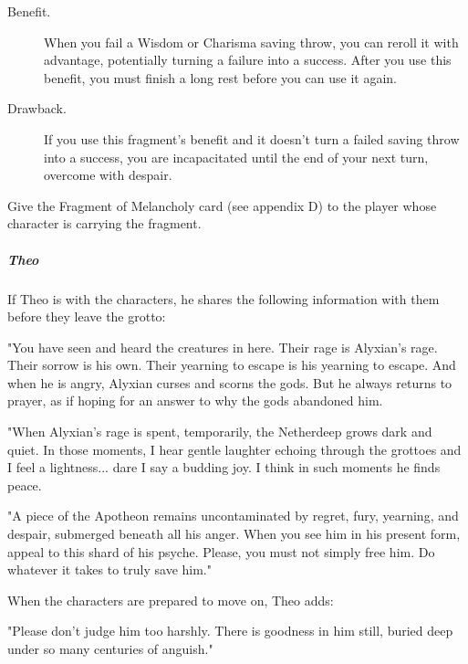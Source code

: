 \documentclass[10pt,a4paper,twoside,bg=print,twocolumn,openany,nodeprecatedcode]{dndbook}
\begin{document}
\begin{DndSidebar}[float=!b]{}

\begin{description}
\item[Benefit.]
When you fail a Wisdom or Charisma saving throw, you can reroll it with advantage, potentially turning a failure into a success. After you use this benefit, you must finish a long rest before you can use it again.
\item[Drawback.]
If you use this fragment's benefit and it doesn't turn a failed saving throw into a success, you are incapacitated until the end of your next turn, overcome with despair.
\end{description}



\end{DndSidebar}

Give the Fragment of Melancholy card (see appendix D) to the player whose character is carrying the fragment.

\subparagraph{Theo}
If Theo is with the characters, he shares the following information with them before they leave the grotto:

\begin{DndReadAloud}{}
"You have seen and heard the creatures in here. Their rage is Alyxian's rage. Their sorrow is his own. Their yearning to escape is his yearning to escape. And when he is angry, Alyxian curses and scorns the gods. But he always returns to prayer, as if hoping for an answer to why the gods abandoned him.

"When Alyxian's rage is spent, temporarily, the Netherdeep grows dark and quiet. In those moments, I hear gentle laughter echoing through the grottoes and I feel a lightness... dare I say a budding joy. I think in such moments he finds peace.

"A piece of the Apotheon remains uncontaminated by regret, fury, yearning, and despair, submerged beneath all his anger. When you see him in his present form, appeal to this shard of his psyche. Please, you must not simply free him. Do whatever it takes to truly save him."

\end{DndReadAloud}

When the characters are prepared to move on, Theo adds:

\begin{DndReadAloud}{}
"Please don't judge him too harshly. There is goodness in him still, buried deep under so many centuries of anguish."

\end{DndReadAloud}
\end{document}
